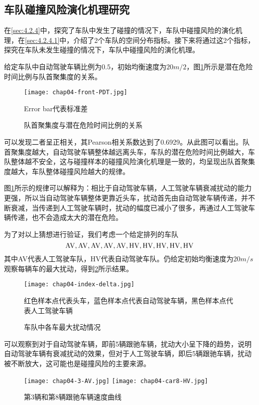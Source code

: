 \subsection{车队碰撞风险演化机理研究}

在\ref{sec:4.2.4}中，探究了车队中发生了碰撞的情况下，车队中碰撞风险的演化机理，在\ref{sec:4.2.4.1}中，介绍了2个车队的空间分布指标。接下来将通过这2个指标，探究在车队未发生碰撞的情况下，车队中碰撞风险的演化机理。

给定车队中自动驾驶车辆比例为$0.5$，初始均衡速度为$20m/2$，图\ref{fig:chap04-9}所示是潜在危险时间比例与队首聚集度的关系。

\begin{figure}
    \centering
    \texttt{[image: chap04-front-PDT.jpg]}
    \caption*{Error bar代表标准差}
    \caption{队首聚集度与潜在危险时间比例的关系}
    \label{fig:chap04-9}
\end{figure} 

可以发现二者呈正相关，其Pearson相关系数达到了0.6929。从此图可以看出。队首聚集度越大，自动驾驶车辆整体越远离头车，车队的潜在危险时间比例越大，车队整体越不安全，这与碰撞样本的碰撞风险演化机理是一致的，均呈现出队首聚集度越大，车队整体碰撞风险越大的规律。

图\ref{fig:chap04-9}所示的规律可以解释为：相比于自动驾驶车辆，人工驾驶车辆衰减扰动的能力更强，所以当自动驾驶车辆整体更靠近头车，扰动首先由自动驾驶车辆传递，并不断衰减，当传递到人工驾驶车辆时，扰动的幅度已减小了很多，再通过人工驾驶车辆传递，也不会造成太大的潜在危险。

为了对以上猜想进行验证，我们考虑一个给定排列的车队
\begin{equation}
    \mathrm{AV, AV, AV, AV, AV, HV, HV, HV, HV, HV} \notag
\end{equation}
其中AV代表人工驾驶车队，HV代表自动驾驶车队。仍给定初始均衡速度为$20m/s$观察每辆车的最大扰动，得到\ref{fig:chap04-10}所示结果。

\begin{figure}
    \centering
    \texttt{[image: chap04-index-delta.jpg]}
    \caption*{红色样本点代表头车，蓝色样本点代表自动驾驶车辆，黑色样本点代表人工驾驶车辆}
    \caption{车队中各车最大扰动情况}
    \label{fig:chap04-10}
\end{figure} 

可以观察到对于自动驾驶车辆，即前5辆跟驰车辆，扰动大小呈下降的趋势，说明自动驾驶车辆有衰减扰动的效果，但对于人工驾驶车辆，即后5辆跟驰车辆，扰动被不断放大，这可能也是碰撞风险的主要来源。

\begin{figure}
    \centering
      {\texttt{[image: chap04-3-AV.jpg]}}
      {\texttt{[image: chap04-car8-HV.jpg]}}
      \caption{第3辆和第8辆跟驰车辆速度曲线}
    \label{fig:chap04-11}
  \end{figure}

